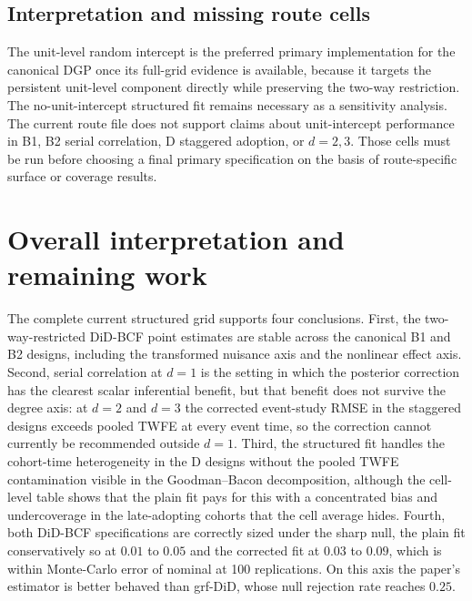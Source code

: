 \documentclass[11pt]{article}
\begin{document}
\subsection{Interpretation and missing route cells}

The unit-level random intercept is the preferred primary implementation for
the canonical DGP once its full-grid evidence is available, because it targets
the persistent unit-level component directly while preserving the two-way
restriction. The no-unit-intercept structured fit remains necessary as a
sensitivity analysis. The current route file does not support claims about
unit-intercept performance in B1, B2 serial correlation, D staggered adoption,
or $d=2,3$. Those cells must be run before choosing a final primary
specification on the basis of route-specific surface or coverage results.

\section{Overall interpretation and remaining work}

The complete current structured grid supports four conclusions. First, the
two-way-restricted DiD-BCF point estimates are stable across the canonical B1
and B2 designs, including the transformed nuisance axis and the nonlinear
effect axis. Second, serial correlation at $d=1$ is the setting in which the
posterior correction has the clearest scalar inferential benefit, but that
benefit does not survive the degree axis: at $d=2$ and $d=3$ the corrected
event-study RMSE in the staggered designs exceeds pooled TWFE at every event
time, so the correction cannot currently be recommended outside $d=1$. Third,
the structured
fit handles the cohort-time heterogeneity in the D designs without the pooled
TWFE contamination visible in the Goodman--Bacon decomposition, although the
cell-level table shows that the plain fit pays for this with a concentrated
bias and undercoverage in the late-adopting cohorts that the cell average
hides. Fourth, both DiD-BCF specifications are correctly sized under the sharp
null, the plain fit conservatively so at $0.01$ to $0.05$ and the corrected fit
at $0.03$ to $0.09$, which is within Monte-Carlo error of nominal at 100
replications. On this axis the paper's estimator is better behaved than
grf-DiD, whose null rejection rate reaches $0.25$.
\end{document}
